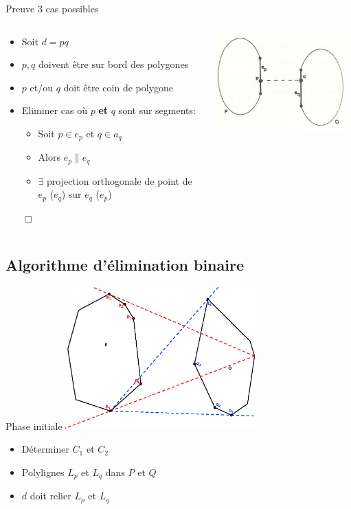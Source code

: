 \documentclass{beamer}
\begin{document}
\begin{frame}{Preuve 3 cas possibles}
	\begin{columns}[c]
	\begin{column}[T]{.5\textwidth}
		\begin{itemize}
		\item Soit $d = pq$
		\item $p, q$ doivent être sur bord des polygones
		\item $p$ et/ou $q$ doit être coin de polygone 
		\item Eliminer cas où $p$ \textbf{et} $q$ sont sur segments:
			\begin{itemize}
			\item Soit $p \in e_{p}$ et $q \in a_{q}$
			\item Alors $e_{p} \parallel e_{q}$
			\item $\exists$ projection orthogonale de point de \\$e_{p}$ ($e_{q}$) sur $e_{q}$ ($e_{p}$)
			\end{itemize} 
			$\Box$
		\end{itemize}
	\end{column}
	\begin{column}[T]{.5\textwidth}
		\includegraphics[width=5cm]{dmincases.png}
	\end{column}
	\end{columns}
\end{frame}

\subsection{Algorithme d'élimination binaire}

\begin{frame}{Phase initiale}
	\includegraphics[height=5.5cm]{dmininit1.eps}
	\begin{itemize}
	\item Déterminer $C_{1}$ et $C_{2}$
	\item Polylignes $L_{p}$ et $L_{q}$ dans $P$ et $Q$
	\item $d$ doit relier $L_{p}$ et $L_{q}$
	\end{itemize}
\end{frame}
\end{document}
